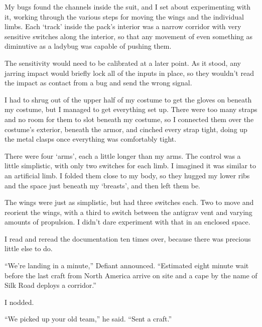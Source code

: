My bugs found the channels inside the suit, and I set about experimenting with it, working through the various steps for moving the wings and the individual limbs.  Each `track' inside the pack's interior was a narrow corridor with very sensitive switches along the interior, so that any movement of even something as diminutive as a ladybug was capable of pushing them.



The sensitivity would need to be calibrated at a later point.  As it stood, any jarring impact would briefly lock all of the inputs in place, so they wouldn't read the impact as contact from a bug and send the wrong signal.



I had to shrug out of the upper half of my costume to get the gloves on beneath my costume, but I managed to get everything set up.  There were too many straps and no room for them to slot beneath my costume, so I connected them over the costume's exterior, beneath the armor, and cinched every strap tight, doing up the metal clasps once everything was comfortably tight.



There were four `arms', each a little longer than my arms.  The control was a little simplistic, with only two switches for each limb.  I imagined it was similar to an artificial limb.  I folded them close to my body, so they hugged my lower ribs and the space just beneath my `breasts', and then left them be.



The wings were just as simplistic, but had three switches each.  Two to move and reorient the wings, with a third to switch between the antigrav vent and varying amounts of propulsion.  I didn't dare experiment with that in an enclosed space.



I read and reread the documentation ten times over, because there was precious little else to do.



``We're landing in a minute,'' Defiant announced.  ``Estimated eight minute wait before the last craft from North America arrive on site and a cape by the name of Silk Road deploys a corridor.''



I nodded.



``We picked up your old team,'' he said.  ``Sent a craft.''



